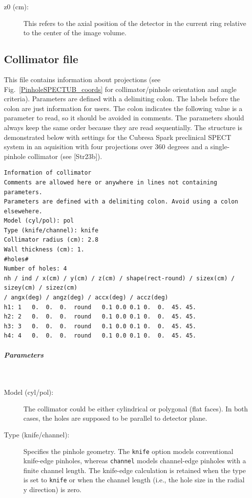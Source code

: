 \documentclass{article}
\newcommand{\subsubsubsubsection}[1]{\subparagraph{#1} \mbox{} \\}
\begin{document}
{{{{\begin{description}
\item[z0 (cm):] This refers to the axial position of the detector in the current ring relative to the center of the image volume.

\end{description}

{ {\subsection*{{Collimator file} }
This file contains information about projections (see Fig.~\ref{PinholeSPECTUB_coords} for collimator/pinhole orientation and angle criteria). Parameters are defined with a delimiting colon. The labels before the colon are just information for users. The colon indicates the following value is a parameter to read, so it should be avoided in comments. The parameters should always keep the same order because they are read sequentially. The structure is demonstrated below with settings for the Cubresa Spark preclinical SPECT system in an aquisition with four projections over 360 degrees and a single-pinhole collimator (see [Str23b]).

\begin{verbatim}
Information of collimator
Comments are allowed here or anywhere in lines not containing parameters.
Parameters are defined with a delimiting colon. Avoid using a colon elsewehere.
Model (cyl/pol): pol
Type (knife/channel): knife
Collimator radius (cm): 2.8
Wall thickness (cm): 1.
#holes#
Number of holes: 4
nh / ind / x(cm) / y(cm) / z(cm) / shape(rect-round) / sizex(cm) / sizey(cm) / sizez(cm)
/ angx(deg) / angz(deg) / accx(deg) / accz(deg)
h1:	1	0.	0.	0.	round	0.1	0.0	0.1	0.	0.	45.	45.
h2:	2	0.	0.	0.	round	0.1	0.0	0.1	0.	0.	45.	45.
h3:	3	0.	0.	0.	round	0.1	0.0	0.1	0.	0.	45.	45.
h4:	4	0.	0.	0.	round	0.1	0.0	0.1	0.	0.	45.	45.
\end{verbatim}

{ \subsubsubsubsection{Parameters} }
\begin{description}

\item[Model (cyl/pol):] The collimator could be either cylindrical or polygonal (flat faces). In both cases, the holes are supposed to be parallel to detector plane.

\item[Type (knife/channel):] Specifies the pinhole geometry. The \texttt{knife} option models conventional knife-edge pinholes, whereas \texttt{channel} models channel-edge pinholes with a finite channel length. The knife-edge calculation is retained when the type is set to \texttt{knife} or when the channel length (i.e., the hole size in the radial y direction) is zero.


\end{description}}}}}}}
\end{document}
